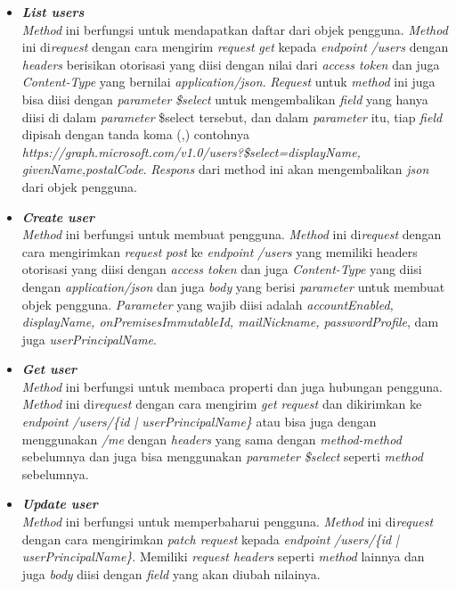 \begin{itemize}
	\item \textbf{\textit{List users}}\\
	\textit{Method} ini berfungsi untuk mendapatkan daftar dari objek pengguna. \textit{Method} ini di\textit{request} dengan cara mengirim \textit{request} \textit{get} kepada \textit{endpoint} \textit{/users} dengan \textit{headers} berisikan otorisasi yang diisi dengan nilai dari \textit{access token} dan juga \textit{Content-Type} yang bernilai \textit{application/json}. \textit{Request} untuk \textit{method} ini juga bisa diisi dengan \textit{parameter} \textit{\$select} untuk mengembalikan \textit{field} yang hanya diisi di dalam \textit{parameter} \$select tersebut, dan dalam \textit{parameter} itu, tiap \textit{field} dipisah dengan tanda koma (,) contohnya \textit{https://graph.microsoft.com/v1.0/users?\$select=displayName,\\givenName,postalCode}.  \textit{Respons} dari method ini akan mengembalikan \textit{json} dari objek pengguna. 
	\item \textbf{\textit{Create user}}\\
	\textit{Method} ini berfungsi untuk membuat pengguna. \textit{Method} ini di\textit{request} dengan cara mengirimkan \textit{request} \textit{post} ke \textit{endpoint} \textit{/users} yang memiliki headers otorisasi yang diisi dengan \textit{access token} dan juga \textit{Content-Type} yang diisi dengan \textit{application/json} dan juga \textit{body} yang berisi \textit{parameter} untuk membuat objek pengguna. \textit{Parameter} yang wajib diisi adalah \textit{accountEnabled, displayName, onPremisesImmutableId, mailNickname, passwordProfile}, dam juga \textit{userPrincipalName}.  
	\item \textbf{\textit{Get user}}\\
	\textit{Method} ini berfungsi untuk membaca properti dan juga hubungan pengguna. \textit{Method} ini di\textit{request} dengan cara mengirim \textit{get request} dan dikirimkan ke \textit{endpoint} \textit{/users/\{id | userPrincipalName\}} atau bisa juga dengan menggunakan \textit{/me} dengan \textit{headers} yang sama dengan \textit{method-method} sebelumnya dan juga bisa menggunakan \textit{parameter} \textit{\$select} seperti \textit{method} sebelumnya.  
	\item \textbf{\textit{Update user}}\\
	\textit{Method} ini berfungsi untuk memperbaharui pengguna. \textit{Method} ini di\textit{request} dengan cara mengirimkan \textit{patch request} kepada \textit{endpoint} \textit{/users/\{id | userPrincipalName\}}. Memiliki \textit{request headers} seperti \textit{method} lainnya dan juga \textit{body} diisi dengan \textit{field} yang akan diubah nilainya. 

\end{itemize}
